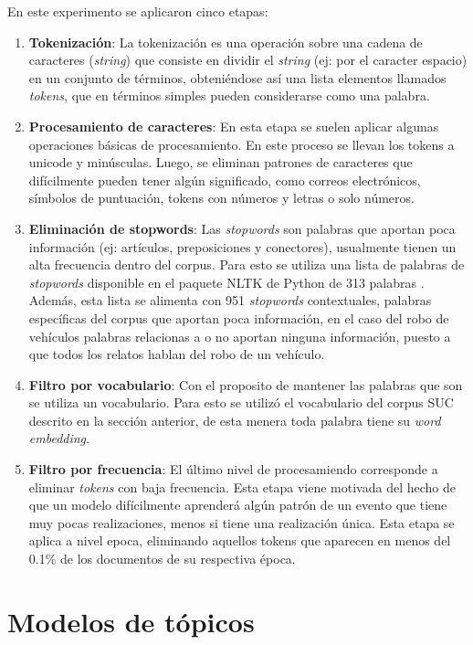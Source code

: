 En este experimento se aplicaron cinco etapas:
\begin{enumerate}
\item \textbf{Tokenización}: La tokenización es una operación sobre una cadena de caracteres (\textit{string}) que consiste en dividir el \textit{string} (ej: por el caracter espacio) en un conjunto de términos, obteniéndose así una lista elementos llamados \textit{tokens}, que en términos simples pueden considerarse como una palabra.
\item \textbf{Procesamiento de caracteres}: En esta etapa se suelen aplicar algunas operaciones básicas de procesamiento. En este proceso se llevan los tokens a unicode y minúsculas. Luego, se eliminan patrones de caracteres que difícilmente pueden tener algún significado, como correos electrónicos, símbolos de puntuación, tokens con números y letras o solo números. 
\item \textbf{Eliminación de stopwords}: Las \textit{stopwords} \citep{wilbur1992automatic} son palabras que aportan poca información (ej: artículos, preposiciones y conectores), usualmente tienen un alta frecuencia dentro del corpus. Para esto se utiliza una lista de palabras de \textit{stopwords} disponible en el paquete NLTK de Python de 313 palabras \citep{bird2009natural}. Además, esta lista se alimenta con 951 \textit{stopwords} contextuales, palabras específicas del corpus que aportan poca información, en el caso del robo de vehículos palabras relacionas a  o  no aportan ninguna información, puesto a que todos los relatos hablan del robo de un vehículo. 
\item \textbf{Filtro por vocabulario}: Con el proposito de mantener las palabras que son  se utiliza un vocabulario. Para esto se utilizó el vocabulario del corpus SUC descrito en la sección anterior, de esta menera toda palabra tiene su \textit{word embedding}. 
\item \textbf{Filtro por frecuencia}: El último nivel de procesamiendo corresponde a eliminar \textit{tokens} con baja frecuencia. Esta etapa viene motivada del hecho de que un modelo difícilmente aprenderá algún patrón de un evento que tiene muy pocas realizaciones, menos si tiene una realización única. Esta etapa se aplica a nivel epoca, eliminando aquellos tokens que aparecen en menos del 0.1\% de los documentos de su respectiva época.
\end{enumerate}

\section{Modelos de tópicos}
\label{sec:model_selected}

